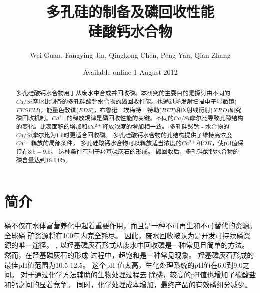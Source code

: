 \documentclass[11pt]{article}
\author{Wei Guan, Fangying Jin, Qingkong Chen, Peng Yan, Qian Zhang}
\date{Available online 1 August 2012}
\title{多孔硅的制备及磷回收性能\\\medskip
\large 硅酸钙水合物}
\begin{document}
\maketitle
\tableofcontents

\begin{abstract}

多孔硅酸钙水合物用于从废水中合成并回收磷。本研究的主要目的是探讨由不同的$Ca/Si$摩尔比制备的多孔硅酸钙水合物的磷回收性能。也通过场发射扫描电子显微镜($FESEM$)，能量色散谱($EDS$)，布鲁诺 - 埃梅特 - 特勒($BET$)和X射线衍射($XRD$)研究磷回收机制。$Ca^{2+}$的释放规律是磷回收性能的关键。不同的$Ca/Si$摩尔比导致孔隙结构的变化。比表面积的增加和$Ca^{2+}$释放浓度的增加相一致。 多孔硅酸钙 - 水合物的$Ca/Si$摩尔比为$1.6$时更适合回收磷。 多孔硅酸钙水合物的孔结构提供了维持高浓度$Ca^{2+}$释放的局部条件。 多孔硅酸钙水合物可以释放适当浓度的$Ca^{2+}$和$OH$，使pH值保持在$8.5-9.5$。 这种条件有利于羟基磷灰石的形成。 磷回收后，多孔硅酸钙水合物的磷含量达到$18.64％$。

\end{abstract}

\section{简介}
\label{sec:orgd4a0af2}
磷不仅在水体富营养化中起着重要作用，而且是一种不可再生和不可替代的资源。\cite{Suzuki_2007} 全球磷
矿资源将在100年内完全耗尽。 因此，废水回收被认为是开发可持续磷资源的唯一途径。
\cite{Efficiency_and_mechanism_of_phosphorus_removal_by_coagulation_of_iron_manganese_composited_oxide}, \cite{song07_seed_selec_cryst_calcium_phosp_phosp_recov}
以羟基磷灰石形式从废水中回收磷是一种常见且简单的方法。
\cite{chen09_phosp_remov_recov_throug_cryst,muench01_contr_struv_cryst_remov_phosp,song06_calcit_seeded_cryst_calcium_phosp_phosp_recov,song06_calcit_seeded_cryst_calcium_phosp_phosp_recov}
然而，在羟基磷灰石的形成
过程中，超饱和是一种常见现象。 羟基磷灰石形成的最佳pH值范围为10.5-12.5。\cite{liu03_influen_ph_temper_morph_hydrox} 这个pH
值太高，生化处理系统的pH值在6.0到9.0之间。\cite{hood01_bioch_hypot_explain_respon_enhan} 对于通过化学方法辅助的生物处理过程去
除磷，较高的pH值也增加了碳酸盐和钙之间的显着竞争。\cite{battistoni00_struv_cryst}
同时，化学处理成本增加，最终产品的有效磷组分减少。\cite{sengupta11_selec_remov_phosp_from_wastew}
\end{document}
